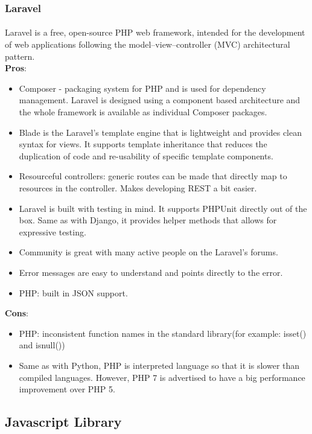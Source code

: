 \documentclass{l4proj}
\begin{document}
\subsubsection{Laravel}
\paragraph{}
Laravel is a free, open-source PHP web framework, intended for the development of web applications following the model–view–controller (MVC) architectural pattern.
\\ \textbf{Pros}:
\begin{itemize}
	\item Composer - packaging system for PHP and is used for dependency management. Laravel is designed using a component based architecture and the whole framework is available as individual Composer packages. 
	\item Blade is the Laravel's template engine that is lightweight and provides clean syntax for views. It supports template inheritance that reduces the duplication of code and re-usability of specific template components. 
	\item Resourceful controllers: generic routes can be made that directly map to resources in the controller. Makes developing REST a bit easier.
	\item Laravel is built with testing in mind. It supports PHPUnit directly out of the box. Same as with Django, it provides helper methods that allows for expressive testing.  
	\item Community is great with many active people on the Laravel's forums.
	\item Error messages are easy to understand and points directly to the error.
	\item PHP: built in JSON support.
\end{itemize}
\textbf{Cons}:
\begin{itemize}
	\item PHP: inconsistent function names in the standard library(for example: isset() and isnull())
	\item Same as with Python, PHP is interpreted language so that it is slower than compiled languages. However, PHP 7 is advertised to have a big performance improvement over PHP 5.
\end{itemize}
\subsection{Javascript Library}
\end{document}
